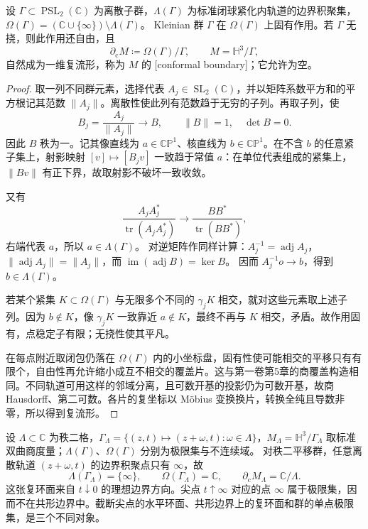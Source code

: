 \begin{proposition}\label{g3:prop:D-domain-discontinuity-quotient}
	设 \(\Gamma\subset\operatorname{PSL}_2(\mathbb C)\) 为离散子群，\(\Lambda(\Gamma)\) 为标准闭球紧化内轨道的边界积聚集，\(\Omega(\Gamma)=(\mathbb C\cup\{\infty\})\setminus\Lambda(\Gamma)\)。
	Kleinian 群 \(\Gamma\) 在 \(\Omega(\Gamma)\) 上固有作用。若 \(\Gamma\) 无挠，则此作用还自由，且
	\begin{equation}\label{g3:eq:D-conformal-boundary}
		\partial_{\mathrm c}M
		    \coloneqq\Omega(\Gamma)/\Gamma,
		    \qquad M=\mathbb H^3/\Gamma,
	\end{equation}
	自然成为一维复流形，称为 \(M\) 的
	[conformal boundary]；它允许为空。
\end{proposition}
\begin{proof}
	取一列不同群元素，选择代表 \(A_j\in\operatorname{SL}_2(\mathbb C)\)，并以矩阵系数平方和的平方根记其范数 \(\|A_j\|\)。离散性使此列有范数趋于无穷的子列。再取子列，使
	\[
		B_j=\frac{A_j}{\|A_j\|}\longrightarrow B,\qquad
		\|B\|=1,\quad\det B=0.
	\]
	因此 \(B\) 秩为一。记其像直线为 \(a\in\mathbb{CP}^1\)、核直线为
	\(b\in\mathbb{CP}^1\)。在不含 \(b\) 的任意紧子集上，射影映射
	\([v]\mapsto[B_jv]\) 一致趋于常值 \(a\)：在单位代表组成的紧集上，
	\(\|Bv\|\) 有正下界，故取射影不破坏一致收敛。

	又有
	\[
		\frac{A_jA_j^*}{\operatorname{tr}(A_jA_j^*)}
		    \longrightarrow\frac{BB^*}{\operatorname{tr}(BB^*)},
	\]
	右端代表 \(a\)，所以 \(a\in\Lambda(\Gamma)\)。
	对逆矩阵作同样计算：\(A_j^{-1}=\operatorname{adj}A_j\)，
	\(\|\operatorname{adj}A_j\|=\|A_j\|\)，而
	\(\operatorname{im}(\operatorname{adj}B)=\ker B\)。
	因而 \(A_j^{-1}o\to b\)，得到 \(b\in\Lambda(\Gamma)\)。

	若某个紧集 \(K\subset\Omega(\Gamma)\) 与无限多个不同的
	\(\gamma_jK\) 相交，就对这些元素取上述子列。因为 \(b\notin K\)，像
	\(\gamma_jK\) 一致靠近 \(a\notin K\)，最终不再与 \(K\) 相交，矛盾。故作用固有，点稳定子有限；无挠性使其平凡。

	在每点附近取闭包仍落在 \(\Omega(\Gamma)\) 内的小坐标盘，固有性使可能相交的平移只有有限个，自由性再允许缩小成互不相交的覆盖片。这与第一卷第5章的商覆盖构造相同。不同轨道可用这样的邻域分离，且可数开基的投影仍为可数开基，故商 Hausdorff、第二可数。各片的复坐标以 Möbius 变换换片，转换全纯且导数非零，所以得到复流形。
\end{proof}

\begin{example}\label{g3:exm:D-parabolic-conformal-boundary}
	设 \(\Lambda\subset\mathbb C\) 为秩二格，\(\Gamma_\Lambda=\{(z,t)\mapsto(z+\omega,t):\omega\in\Lambda\}\)，\(M_\Lambda=\mathbb H^3/\Gamma_\Lambda\) 取标准双曲商度量；\(\Lambda(\Gamma)\)、\(\Omega(\Gamma)\) 分别为极限集与不连续域。
	对秩二平移群，任意离散轨道 \((z+\omega,t)\) 的边界积聚点只有
	\(\infty\)，故
	\[
		\Lambda(\Gamma_\Lambda)=\{\infty\},\qquad
		\Omega(\Gamma_\Lambda)=\mathbb C,\qquad
		\partial_{\mathrm c}M_\Lambda=\mathbb C/\Lambda.
	\]
	这张复环面来自 \(t\downarrow0\) 的理想边界方向。尖点
	\(t\uparrow\infty\) 对应的点 \(\infty\) 属于极限集，因而不在共形边界中。截断尖点的水平环面、共形边界上的复环面和群的单点极限集，是三个不同对象。
\end{example}

